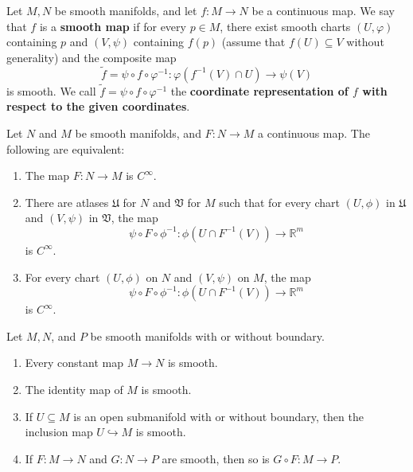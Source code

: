 \documentclass[12pt, oneside]{book}
\begin{document}
\begin{definition}
    Let $M, N$ be smooth manifolds, and let $f: M \rightarrow N$ be a continuous map. We say that $f$ is a \textbf{smooth map} if for every $p \in M$, there exist smooth charts $(U, \varphi)$ containing $p$ and $(V, \psi)$ containing $f(p)$ (assume that $f(U) \subseteq V$ without generality) and the composite map
    \begin{equation*}
        \tilde{f}=\psi \circ f \circ \varphi^{-1} :\varphi(f^{-1}(V)\cap U)\rightarrow \psi(V)
    \end{equation*}
    is smooth. We call $\tilde{f}=\psi \circ f \circ \varphi^{-1}$ the \textbf{coordinate representation
        of $f$ with respect to the given coordinates}.
\end{definition}

\begin{proposition}
    Let $N$ and $M$ be smooth manifolds, and $F: N \rightarrow M$ a continuous map. The following are equivalent:
    \begin{enumerate}
        \item
              The map $F: N \rightarrow M$ is $C^{\infty}$.

        \item
              There are atlases $\mathfrak{U}$ for $N$ and $\mathfrak{V}$ for $M$ such that for every chart $\left(U, \phi\right)$ in $\mathfrak{U}$ and $(V, \psi)$ in $\mathfrak{V}$, the map
              \begin{equation*}
                  \psi \circ F \circ \phi^{-1}: \phi\left(U \cap F^{-1}(V)\right) \rightarrow \mathbb{R}^m
              \end{equation*}
              is $C^{\infty}$.

        \item
              For every chart $\left(U, \phi\right)$ on $N$ and $\left(V, \psi\right)$ on $M$, the map
              \begin{equation*}
                  \psi \circ F \circ \phi^{-1}: \phi\left(U \cap F^{-1}(V)\right) \rightarrow \mathbb{R}^m
              \end{equation*}
              is $C^{\infty}$.
    \end{enumerate}
\end{proposition}




\begin{proposition}
    Let $M, N$, and $P$ be smooth manifolds with or without boundary.
    \begin{enumerate}
        \item
              Every constant map $M \rightarrow N$ is smooth.
        \item  The identity map of $M$ is smooth.
        \item
              If $U \subseteq M$ is an open submanifold with or without boundary, then the inclusion map $U \hookrightarrow M$ is smooth.
        \item
              If $F: M \rightarrow N$ and $G: N \rightarrow P$ are smooth, then so is $G \circ F: M \rightarrow P$.
    \end{enumerate}
\end{proposition}
\end{document}
